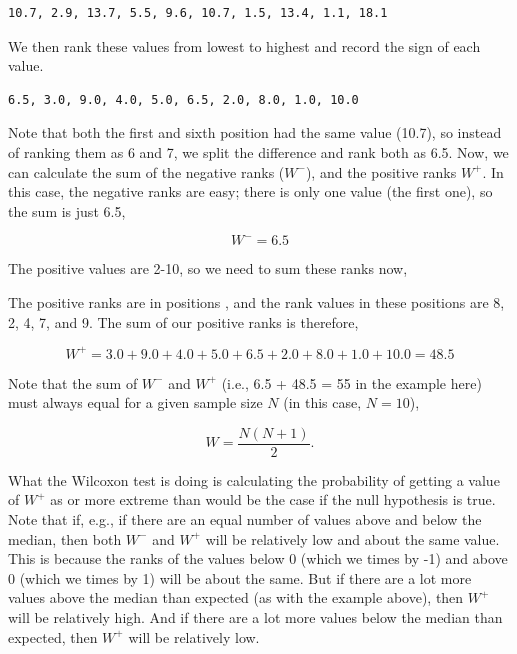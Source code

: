 \documentclass[
]{scrbook}
\begin{document}
\begin{verbatim}
10.7, 2.9, 13.7, 5.5, 9.6, 10.7, 1.5, 13.4, 1.1, 18.1
\end{verbatim}

We then rank these values from lowest to highest and record the sign of each value.

\begin{verbatim}
6.5, 3.0, 9.0, 4.0, 5.0, 6.5, 2.0, 8.0, 1.0, 10.0
\end{verbatim}

Note that both the first and sixth position had the same value (10.7), so instead of ranking them as 6 and 7, we split the difference and rank both as 6.5.
Now, we can calculate the sum of the negative ranks (\(W^{-}\)), and the positive ranks \(W^{+}\).
In this case, the negative ranks are easy; there is only one value (the first one), so the sum is just 6.5,

\[W^{-} = 6.5\]

The positive values are 2-10, so we need to sum these ranks now,

The positive ranks are in positions , and the rank values in these positions are 8, 2, 4, 7, and 9.
The sum of our positive ranks is therefore,

\[W^{+} = 3.0 + 9.0 + 4.0 + 5.0 + 6.5 + 2.0 + 8.0 + 1.0 + 10.0 = 48.5\]

Note that the sum of \(W^{-}\) and \(W^{+}\) (i.e., 6.5 + 48.5 = 55 in the example here) must always equal for a given sample size \(N\) (in this case, \(N = 10\)),

\[W = \frac{N \left(N + 1 \right)}{2}.\]

What the Wilcoxon test is doing is calculating the probability of getting a value of \(W^{+}\) as or more extreme than would be the case if the null hypothesis is true.
Note that if, e.g., if there are an equal number of values above and below the median, then both \(W^{-}\) and \(W^{+}\) will be relatively low and about the same value.
This is because the ranks of the values below 0 (which we times by -1) and above 0 (which we times by 1) will be about the same.
But if there are a lot more values above the median than expected (as with the example above), then \(W^{+}\) will be relatively high.
And if there are a lot more values below the median than expected, then \(W^{+}\) will be relatively low.
\end{document}
